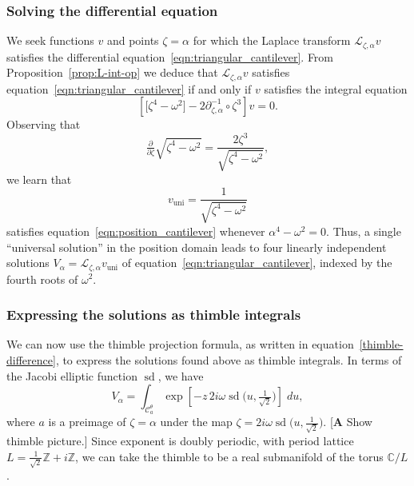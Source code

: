 \documentclass{article}
\newcommand{\Z}{\mathbb{Z}}
\newcommand{\C}{\mathbb{C}}
\newcommand{\fracderiv}[3]{\partial^{#1}_{#2, #3}}
\newcommand{\laplace}{\mathcal{L}}
\theoremstyle{definition}
\theoremstyle{plain}
\newenvironment{todo}{\color{Coral}}{\color{black}}
\begin{document}
\subsubsection{Solving the differential equation}
We seek functions $v$ and points $\zeta = \alpha$ for which the Laplace transform $\laplace_{\zeta, \alpha} v$ satisfies the differential equation~\eqref{eqn:triangular_cantilever}. From Proposition~\ref{prop:L-int-op} we deduce that $\laplace_{\zeta, \alpha} v$ satisfies equation~\eqref{eqn:triangular_cantilever} if and only if $v$ satisfies the integral equation
\begin{equation}\label{eqn:position_cantilever}
\left[ \big[ \zeta^4 - \omega^2 \big] - 2\fracderiv{-1}{\zeta}{\alpha} \circ \zeta^3 \right] v = 0.
\end{equation}
Observing that
\[ \tfrac{\partial}{\partial \zeta} \sqrt{\zeta^4 - \omega^2} = \frac{2\zeta^3}{\sqrt{\zeta^4 - \omega^2}}, \]
we learn that
\begin{equation}
v_\text{uni} = \frac{1}{\sqrt{\zeta^4 - \omega^2}}
\end{equation}
satisfies equation~\eqref{eqn:position_cantilever} whenever $\alpha^4 - \omega^2 = 0$. Thus, a single ``universal solution'' in the position domain leads to four linearly independent solutions $V_\alpha = \laplace_{\zeta, \alpha} v_\text{uni}$ of equation~\eqref{eqn:triangular_cantilever}, indexed by the fourth roots of $\omega^2$.
\subsubsection{Expressing the solutions as thimble integrals}
We can now use the thimble projection formula, as written in equation~\eqref{thimble-difference}, to express the solutions found above as thimble integrals. In terms of the Jacobi elliptic function $\operatorname{sd}$, we have
\begin{equation}\label{eq:cantilever-thimble}
V_\alpha = \int_{\mathcal{C}_a^\theta} \exp\left[ -z\,2i\omega \operatorname{sd}\big(u, \tfrac{1}{\sqrt{2}}\big) \right]\;du,  \end{equation}
where $a$ is a preimage of $\zeta = \alpha$ under the map $\zeta = 2i\omega \operatorname{sd}\big(u, \tfrac{1}{\sqrt{2}}\big)$. \begin{todo}[\textbf{A} Show thimble picture.]\end{todo} Since exponent is doubly periodic, with period lattice $L = \tfrac{1}{\sqrt{2}}\Z + i\Z$, we can take the thimble to be a real submanifold of the torus $\C / L$.
\end{document}
